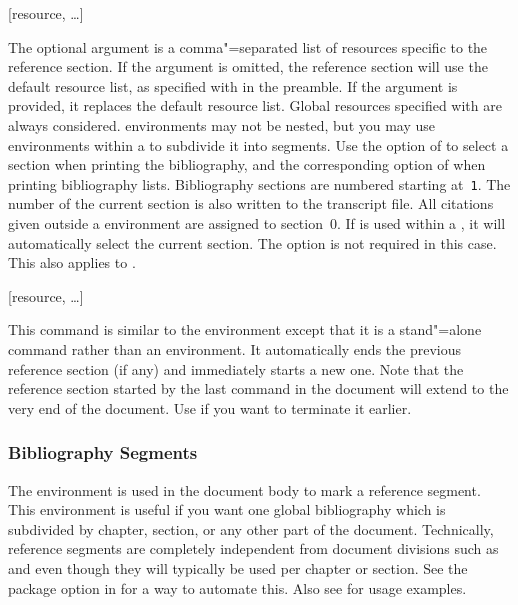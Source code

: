 \documentclass{ltxdockit}[2011/03/25]
\begin{document}
\begin{ltxsyntax}

[resource, \dots]

The optional argument is a comma"=separated list of resources specific to the reference section. If the argument is omitted, the reference section will use the default resource list, as specified with  in the preamble. If the argument is provided, it replaces the default resource list. Global resources specified with  are always considered.  environments may not be nested, but you may use  environments within a  to subdivide it into segments. Use the  option of  to select a section when printing the bibliography, and the corresponding option of  when printing bibliography lists. Bibliography sections are numbered starting at~\texttt{1}. The number of the current section is also written to the transcript file. All citations given outside a  environment are assigned to section~0. If  is used within a , it will automatically select the current section. The  option is not required in this case. This also applies to .

[resource, \dots]

This command is similar to the  environment except that it is a stand"=alone command rather than an environment. It automatically ends the previous reference section (if any) and immediately starts a new one. Note that the reference section started by the last  command in the document will extend to the very end of the document. Use  if you want to terminate it earlier.

\end{ltxsyntax}

\subsubsection{Bibliography Segments}
\label{use:bib:seg}

The  environment is used in the document body to mark a reference segment. This environment is useful if you want one global bibliography which is subdivided by chapter, section, or any other part of the document. Technically, reference segments are completely independent from document divisions such as  and  even though they will typically be used per chapter or section. See the  package option in  for a way to automate this. Also see  for usage examples.
\end{document}
